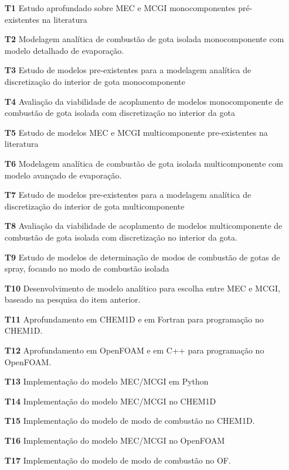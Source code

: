 \begin{itemize}
\setlength{\itemsep}{0cm}
\item[\textbf{T1}] Estudo aprofundado sobre MEC e MCGI monocomponentes pré-existentes na literatura\item[\textbf{T2}] Modelagem analítica de combustão de gota isolada monocomponente com modelo detalhado de evaporação.\item[\textbf{T3}] Estudo de modelos pre-existentes para a modelagem  analítica de discretização do interior de gota monocomponente\item[\textbf{T4}] Avaliação da viabilidade de acoplamento de modelos monocomponente de combustão de gota isolada com discretização no interior da gota
\item[\textbf{T5}] Estudo de modelos MEC e MCGI multicomponente pre-existentes na literatura\item[\textbf{T6}] Modelagem analítica de combustão de gota isolada multicomponente com modelo avançado de evaporação.\item[\textbf{T7}] Estudo de modelos pre-existentes para a modelagem analítica de discretização do interior de gota multicomponente\item[\textbf{T8}] Avaliação da viabilidade de acoplamento de modelos multicomponente de combustão de gota isolada com discretização no interior da gota. 

\item[\textbf{T9}] Estudo de modelos de determinação de modos de combustão de gotas de spray, focando no modo de combustão isolada\item[\textbf{T10}] Desenvolvimento de modelo analítico para escolha entre MEC e MCGI, baseado na pesquisa do item anterior.

\item[\textbf{T11}] Aprofundamento em CHEM1D e em Fortran para programação no CHEM1D.
\item[\textbf{T12}] Aprofundamento em OpenFOAM e em C++ para programação no OpenFOAM.

\item[\textbf{T13}] Implementação do modelo MEC/MCGI em Python\item[\textbf{T14}] Implementação do modelo MEC/MCGI no CHEM1D\item[\textbf{T15}] Implementação do modelo de modo de combustão no CHEM1D.
\item[\textbf{T16}] Implementação do modelo MEC/MCGI no OpenFOAM\item[\textbf{T17}] Implementação do modelo de modo de combustão no OF.


\end{itemize}
